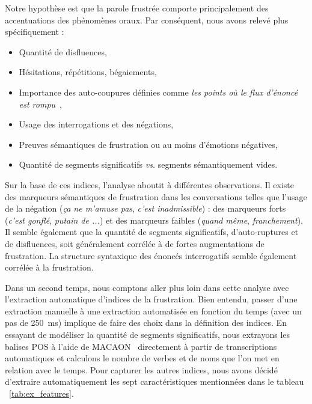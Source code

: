 Notre hypothèse est que la parole frustrée comporte principalement  des accentuations des phénomènes oraux.
Par conséquent, nous avons relevé plus spécifiquement :
\begin{itemize}
    \item Quantité de disfluences,
    \item Hésitations, répétitions, bégaiements,
    \item Importance des auto-coupures définies comme \textit{les points où le flux d'énoncé est rompu}~\cite{Pallaud2019},
    \item Usage des interrogations et des négations,
    \item Preuves sémantiques de frustration ou au moins d'émotions négatives,
    \item Quantité de segments significatifs \textit{vs.} segments sémantiquement vides.
\end{itemize}

Sur la base de ces indices, l'analyse aboutit à différentes observations.
Il existe des marqueurs sémantiques de frustration dans les conversations telles que l'usage de la négation (\textit{ça ne m'amuse pas}, \textit{c'est inadmissible}) : des marqueurs forts (\textit{c'est gonflé}, \textit{putain de ...}) et des marqueurs faibles (\textit{quand même}, \textit{franchement}).
Il semble également que la quantité de segments significatifs, d'auto-ruptures et de disfluences, soit généralement corrélée à de fortes augmentations de frustration. La structure syntaxique des énoncés interrogatifs semble également corrélée à la frustration.

Dans un second temps, nous comptons aller plus loin dans cette analyse avec l'extraction automatique d'indices de la frustration.
Bien entendu, passer d'une extraction manuelle à une extraction automatisée en fonction du temps (avec un pas de 250~ms) implique de faire des choix dans la définition des indices.
En essayant de modéliser la quantité de segments significatifs, nous extrayons les balises POS à l'aide de MACAON~\cite{Nasr2011} directement à partir de transcriptions automatiques et calculons le nombre de verbes et de noms que l'on met en relation avec le temps.
Pour capturer les autres indices, nous avons décidé d'extraire automatiquement les sept caractéristiques mentionnées dans le tableau ~\ref{tab:ex_features}.

